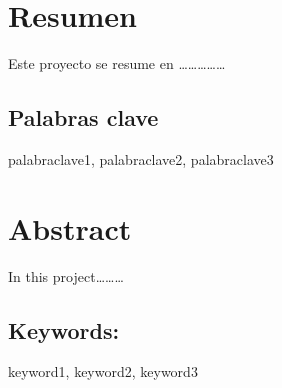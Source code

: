 \chapter{Resumen}

Este proyecto se resume en \ldots{}\ldots{}\ldots{}\ldots{}\ldots{}

\section*{Palabras clave}
palabraclave1, palabraclave2, palabraclave3

\chapter{Abstract}

In this project\ldots{}\ldots{}\ldots{}

\section*{Keywords:}
keyword1, keyword2, keyword3
